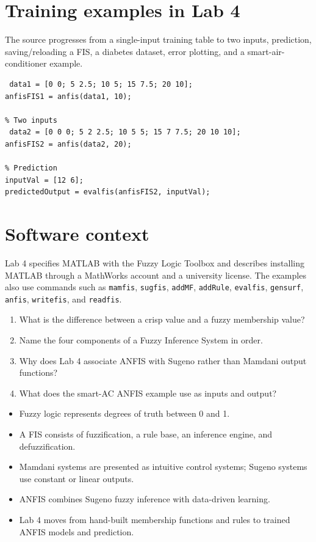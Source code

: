 \section{Training examples in Lab 4}

The source progresses from a single-input training table to two inputs, prediction, saving/reloading a FIS, a diabetes dataset, error plotting, and a smart-air-conditioner example.

\begin{lstlisting}[style=mlmatlab]
% Single input
 data1 = [0 0; 5 2.5; 10 5; 15 7.5; 20 10];
anfisFIS1 = anfis(data1, 10);

% Two inputs
 data2 = [0 0 0; 5 2 2.5; 10 5 5; 15 7 7.5; 20 10 10];
anfisFIS2 = anfis(data2, 20);

% Prediction
inputVal = [12 6];
predictedOutput = evalfis(anfisFIS2, inputVal);
\end{lstlisting}

\section{Software context}

Lab 4 specifies MATLAB with the Fuzzy Logic Toolbox and describes installing MATLAB through a MathWorks account and a university license. The examples also use commands such as \texttt{mamfis}, \texttt{sugfis}, \texttt{addMF}, \texttt{addRule}, \texttt{evalfis}, \texttt{gensurf}, \texttt{anfis}, \texttt{writefis}, and \texttt{readfis}.



\begin{quickcheck}
\begin{enumerate}
  \item What is the difference between a crisp value and a fuzzy membership value?
  \item Name the four components of a Fuzzy Inference System in order.
  \item Why does Lab 4 associate ANFIS with Sugeno rather than Mamdani output functions?
  \item What does the smart-AC ANFIS example use as inputs and output?
\end{enumerate}
\end{quickcheck}

\begin{chapterrecap}
\begin{itemize}
  \item Fuzzy logic represents degrees of truth between 0 and 1.
  \item A FIS consists of fuzzification, a rule base, an inference engine, and defuzzification.
  \item Mamdani systems are presented as intuitive control systems; Sugeno systems use constant or linear outputs.
  \item ANFIS combines Sugeno fuzzy inference with data-driven learning.
  \item Lab 4 moves from hand-built membership functions and rules to trained ANFIS models and prediction.
\end{itemize}
\end{chapterrecap}
